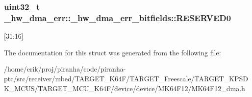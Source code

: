 \subsubsection[{\texorpdfstring{R\+E\+S\+E\+R\+V\+E\+D0}{RESERVED0}}]{\setlength{\rightskip}{0pt plus 5cm}uint32\+\_\+t \+\_\+hw\+\_\+dma\+\_\+err\+::\+\_\+hw\+\_\+dma\+\_\+err\+\_\+bitfields\+::\+R\+E\+S\+E\+R\+V\+E\+D0}\hypertarget{struct__hw__dma__err_1_1__hw__dma__err__bitfields_a7b7f1e36a3294f00c26398ba66650a02}{}\label{struct__hw__dma__err_1_1__hw__dma__err__bitfields_a7b7f1e36a3294f00c26398ba66650a02}
\mbox{[}31\+:16\mbox{]} 

The documentation for this struct was generated from the following file\+:\begin{DoxyCompactItemize}
\item 
/home/erik/proj/piranha/code/piranha-\/ptc/src/receiver/mbed/\+T\+A\+R\+G\+E\+T\+\_\+\+K64\+F/\+T\+A\+R\+G\+E\+T\+\_\+\+Freescale/\+T\+A\+R\+G\+E\+T\+\_\+\+K\+P\+S\+D\+K\+\_\+\+M\+C\+U\+S/\+T\+A\+R\+G\+E\+T\+\_\+\+M\+C\+U\+\_\+\+K64\+F/device/device/\+M\+K64\+F12/M\+K64\+F12\+\_\+dma.\+h\end{DoxyCompactItemize}
